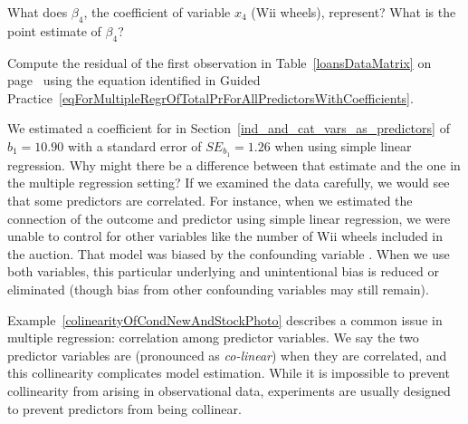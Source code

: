 \begin{exercisewrap}
\begin{nexercise}
What does $\beta_4$, the coefficient of variable $x_4$ (Wii wheels), represent? What is the point estimate of $\beta_4$?\footnotemark
\end{nexercise}
\end{exercisewrap}

\begin{exercisewrap}
\begin{nexercise} \label{computeMultipleRegressionResidualForMarioKart}%
Compute the residual of the first observation in Table~\ref{loansDataMatrix} on page~\pageref{loansDataMatrix} using the equation identified in Guided Practice~\ref{eqForMultipleRegrOfTotalPrForAllPredictorsWithCoefficients}.\footnotemark
\end{nexercise}
\end{exercisewrap}

\begin{examplewrap}
\begin{nexample}{We estimated a coefficient for  in Section~\ref{ind_and_cat_vars_as_predictors} of $b_1 = 10.90$ with a standard error of $SE_{b_1} = 1.26$ when using simple linear regression. Why might there be a difference between that estimate and the one in the multiple regression setting?} \label{colinearityOfCondNewAndStockPhoto}
If we examined the data carefully, we would see that some predictors are correlated. For instance, when we estimated the connection of the outcome  and predictor  using simple linear regression, we were unable to control for other variables like the number of Wii wheels included in the auction. That model was biased by the confounding variable . When we use both variables, this particular underlying and unintentional bias is reduced or eliminated (though bias from other confounding variables may still remain).
\end{nexample}
\end{examplewrap}

Example~\ref{colinearityOfCondNewAndStockPhoto} describes a common issue in multiple regression: correlation among predictor variables. We say the two predictor variables are  (pronounced as \emph{co-linear}) when they are correlated, and this collinearity complicates model estimation. While it is impossible to prevent collinearity from arising in observational data, experiments are usually designed to prevent predictors from being collinear.

